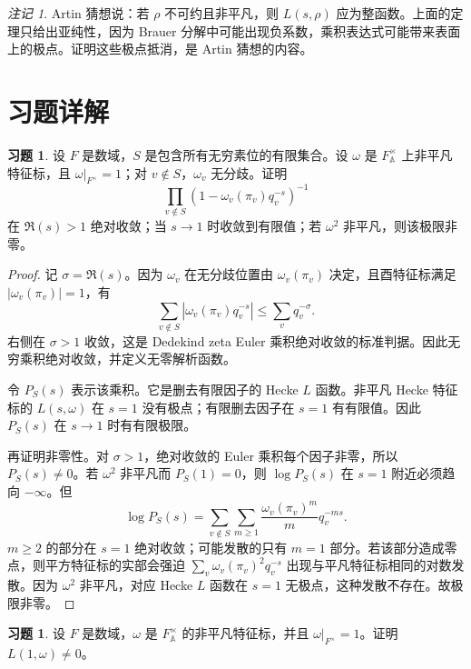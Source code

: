 \documentclass[11pt,a4paper,openany]{ctexbook}
\numberwithin{equation}{chapter}
\newcommand{\A}{\mathbb{A}}
\theoremstyle{plain}
\theoremstyle{definition}
\newtheorem{exercise}[theorem]{习题}
\theoremstyle{remark}
\newtheorem{remark}[theorem]{注记}
\begin{document}
\begin{remark}
Artin 猜想说：若 $\rho$ 不可约且非平凡，则 $L(s,\rho)$ 应为整函数。上面的定理只给出亚纯性，因为 Brauer 分解中可能出现负系数，乘积表达式可能带来表面上的极点。证明这些极点抵消，是 Artin 猜想的内容。
\end{remark}

\section{习题详解}

\begin{exercise}
设 $F$ 是数域，$S$ 是包含所有无穷素位的有限集合。设 $\omega$ 是 $F_{\A}^{\times}$ 上非平凡特征标，且 $\omega|_{F^\times}=1$；对 $v\notin S$，$\omega_v$ 无分歧。证明
\[
  \prod_{v\notin S}(1-\omega_v(\pi_v)q_v^{-s})^{-1}
\]
在 $\Re(s)>1$ 绝对收敛；当 $s\to1$ 时收敛到有限值；若 $\omega^2$ 非平凡，则该极限非零。
\end{exercise}

\begin{proof}
记 $\sigma=\Re(s)$。因为 $\omega_v$ 在无分歧位置由 $\omega_v(\pi_v)$ 决定，且酉特征标满足 $|\omega_v(\pi_v)|=1$，有
\[
  \sum_{v\notin S}|\omega_v(\pi_v)q_v^{-s}|
  \le
  \sum_v q_v^{-\sigma}.
\]
右侧在 $\sigma>1$ 收敛，这是 Dedekind zeta Euler 乘积绝对收敛的标准判据。因此无穷乘积绝对收敛，并定义无零解析函数。

令 $P_S(s)$ 表示该乘积。它是删去有限因子的 Hecke $L$ 函数。非平凡 Hecke 特征标的 $L(s,\omega)$ 在 $s=1$ 没有极点；有限删去因子在 $s=1$ 有有限值。因此 $P_S(s)$ 在 $s\to1$ 时有有限极限。

再证明非零性。对 $\sigma>1$，绝对收敛的 Euler 乘积每个因子非零，所以 $P_S(s)\ne0$。若 $\omega^2$ 非平凡而 $P_S(1)=0$，则 $\log P_S(s)$ 在 $s=1$ 附近必须趋向 $-\infty$。但
\[
  \log P_S(s)=
  \sum_{v\notin S}\sum_{m\ge1}
  \frac{\omega_v(\pi_v)^m}{m}q_v^{-ms}.
\]
$m\ge2$ 的部分在 $s=1$ 绝对收敛；可能发散的只有 $m=1$ 部分。若该部分造成零点，则平方特征标的实部会强迫 $\sum_v\omega_v(\pi_v)^2q_v^{-s}$ 出现与平凡特征标相同的对数发散。因为 $\omega^2$ 非平凡，对应 Hecke $L$ 函数在 $s=1$ 无极点，这种发散不存在。故极限非零。
\end{proof}

\begin{exercise}
设 $F$ 是数域，$\omega$ 是 $F_{\A}^{\times}$ 的非平凡特征标，并且 $\omega|_{F^\times}=1$。证明 $L(1,\omega)\ne0$。
\end{exercise}
\end{document}

